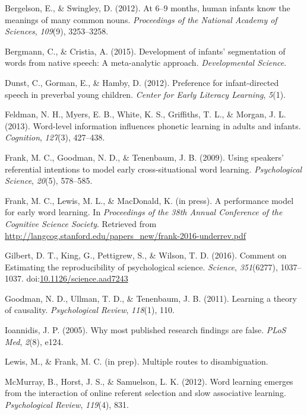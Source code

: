 \documentclass[english,floatsintext,man]{apa6}
\begin{document}
\hypertarget{ref-bergelson2016}{}
Bergelson, E., \& Swingley, D. (2012). At 6--9 months, human infants
know the meanings of many common nouns. \emph{Proceedings of the
National Academy of Sciences}, \emph{109}(9), 3253--3258.

\hypertarget{ref-bergmann2015development}{}
Bergmann, C., \& Cristia, A. (2015). Development of infants'
segmentation of words from native speech: A meta-analytic approach.
\emph{Developmental Science}.

\hypertarget{ref-dunst2012preference}{}
Dunst, C., Gorman, E., \& Hamby, D. (2012). Preference for
infant-directed speech in preverbal young children. \emph{Center for
Early Literacy Learning}, \emph{5}(1).

\hypertarget{ref-feldman2013word}{}
Feldman, N. H., Myers, E. B., White, K. S., Griffiths, T. L., \& Morgan,
J. L. (2013). Word-level information influences phonetic learning in
adults and infants. \emph{Cognition}, \emph{127}(3), 427--438.

\hypertarget{ref-frank2009using}{}
Frank, M. C., Goodman, N. D., \& Tenenbaum, J. B. (2009). Using
speakers' referential intentions to model early cross-situational word
learning. \emph{Psychological Science}, \emph{20}(5), 578--585.

\hypertarget{ref-frank2016performance}{}
Frank, M. C., Lewis, M. L., \& MacDonald, K. (in press). A performance
model for early word learning. In \emph{Proceedings of the 38th Annual
Conference of the Cognitive Science Society}. Retrieved from
\url{http://langcog.stanford.edu/papers_new/frank-2016-underrev.pdf}

\hypertarget{ref-Gilbert1037}{}
Gilbert, D. T., King, G., Pettigrew, S., \& Wilson, T. D. (2016).
Comment on Estimating the reproducibility of psychological science.
\emph{Science}, \emph{351}(6277), 1037--1037.
doi:\href{https://doi.org/10.1126/science.aad7243}{10.1126/science.aad7243}

\hypertarget{ref-goodman2011learning}{}
Goodman, N. D., Ullman, T. D., \& Tenenbaum, J. B. (2011). Learning a
theory of causality. \emph{Psychological Review}, \emph{118}(1), 110.

\hypertarget{ref-ioannidis2005most}{}
Ioannidis, J. P. (2005). Why most published research findings are false.
\emph{PLoS Med}, \emph{2}(8), e124.

\hypertarget{ref-lfprep}{}
Lewis, M., \& Frank, M. C. (in prep). Multiple routes to disambiguation.

\hypertarget{ref-mcmurray2012word}{}
McMurray, B., Horst, J. S., \& Samuelson, L. K. (2012). Word learning
emerges from the interaction of online referent selection and slow
associative learning. \emph{Psychological Review}, \emph{119}(4), 831.
\end{document}

